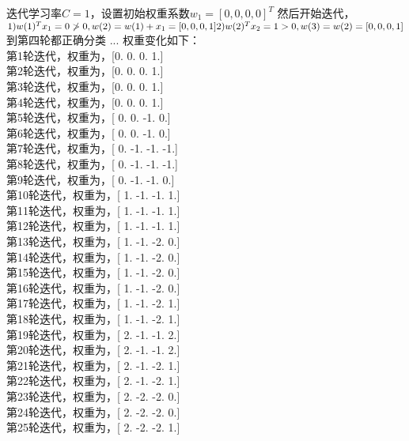 \documentclass{article}
\begin{document}
\begin{CJK*}{UTF8}{gbsn}
    \noindent
    迭代学习率$C=1$，设置初始权重系数$w_{1}=[0, 0, 0, 0]^{T}$
    然后开始迭代，\\
    \begin{math}
        1) w(1)^{T}x_{1}=0 \ngtr 0, w(2) = w(1) + x_{1} = [0, 0, 0, 1] \\
        2) w(2)^{T}x_{2}=1 > 0, w(3) = w(2) = [0, 0, 0, 1] \\
    \end{math}
    到第四轮都正确分类
    ...
    权重变化如下： \\
    第1轮迭代，权重为，[0. 0. 0. 1.]\\
    第2轮迭代，权重为，[0. 0. 0. 1.]\\
    第3轮迭代，权重为，[0. 0. 0. 1.]\\
    第4轮迭代，权重为，[0. 0. 0. 1.]\\
    第5轮迭代，权重为，[ 0.  0. -1.  0.]\\
    第6轮迭代，权重为，[ 0.  0. -1.  0.]\\
    第7轮迭代，权重为，[ 0. -1. -1. -1.]\\
    第8轮迭代，权重为，[ 0. -1. -1. -1.]\\
    第9轮迭代，权重为，[ 0. -1. -1.  0.]\\
    第10轮迭代，权重为，[ 1. -1. -1.  1.]\\
    第11轮迭代，权重为，[ 1. -1. -1.  1.]\\
    第12轮迭代，权重为，[ 1. -1. -1.  1.]\\
    第13轮迭代，权重为，[ 1. -1. -2.  0.]\\
    第14轮迭代，权重为，[ 1. -1. -2.  0.]\\
    第15轮迭代，权重为，[ 1. -1. -2.  0.]\\
    第16轮迭代，权重为，[ 1. -1. -2.  0.]\\
    第17轮迭代，权重为，[ 1. -1. -2.  1.]\\
    第18轮迭代，权重为，[ 1. -1. -2.  1.]\\
    第19轮迭代，权重为，[ 2. -1. -1.  2.]\\
    第20轮迭代，权重为，[ 2. -1. -1.  2.]\\
    第21轮迭代，权重为，[ 2. -1. -2.  1.]\\
    第22轮迭代，权重为，[ 2. -1. -2.  1.]\\
    第23轮迭代，权重为，[ 2. -2. -2.  0.]\\
    第24轮迭代，权重为，[ 2. -2. -2.  0.]\\
    第25轮迭代，权重为，[ 2. -2. -2.  1.]\\

\end{CJK*}
\end{document}
